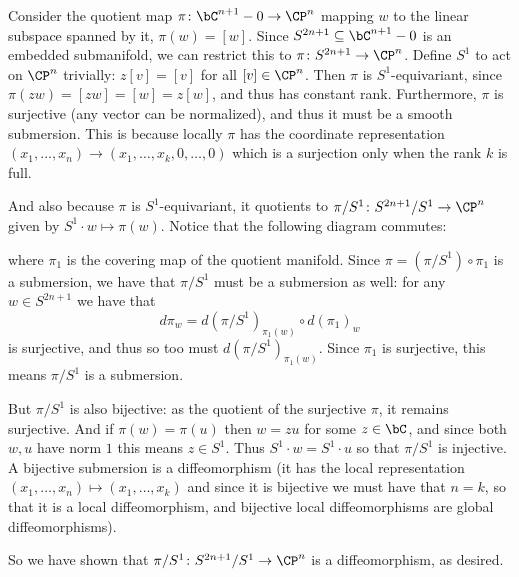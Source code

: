     Consider the quotient map $\pi\colon\bC^{n+1}-0\to\CP^n$ mapping $w$ to the linear subspace spanned by it, $\pi(w)=[w]$.
    Since $S^{2n+1}\subseteq\bC^{n+1}-0$ is an embedded submanifold, we can restrict this to $\pi\colon S^{2n+1}\to\CP^n$.
    Define $S^1$ to act on $\CP^n$ trivially: $z[v]=[v]$ for all $[v]\in\CP^n$.
    Then $\pi$ is $S^1$-equivariant, since $\pi(zw)=[zw]=[w]=z[w]$, and thus has constant rank.
    Furthermore, $\pi$ is surjective (any vector can be normalized), and thus it must be a smooth submersion.
    This is because locally $\pi$ has the coordinate representation $(x_1,\dots,x_n)\to(x_1,\dots,x_k,0,\dots,0)$ which is a surjection only when the rank $k$ is full.

    And also because $\pi$ is $S^1$-equivariant, it quotients to $\pi/S^1\colon S^{2n+1}/S^1\to\CP^n$ given by $S^1\cdot w\mapsto\pi(w)$.
    Notice that the following diagram commutes:

    \centerline{}

    where $\pi_1$ is the covering map of the quotient manifold.
    Since $\pi=(\pi/S^1)\circ\pi_1$ is a submersion, we have that $\pi/S^1$ must be a submersion as well: for any $w\in S^{2n+1}$ we have that
    $$ d\pi_w = d(\pi/S^1)_{\pi_1(w)}\circ d(\pi_1)_w $$
    is surjective, and thus so too must $d(\pi/S^1)_{\pi_1(w)}$.
    Since $\pi_1$ is surjective, this means $\pi/S^1$ is a submersion.

    But $\pi/S^1$ is also bijective: as the quotient of the surjective $\pi$, it remains surjective.
    And if $\pi(w)=\pi(u)$ then $w=zu$ for some $z\in\bC$, and since both $w,u$ have norm $1$ this means $z\in S^1$.
    Thus $S^1\cdot w=S^1\cdot u$ so that $\pi/S^1$ is injective.
    A bijective submersion is a diffeomorphism (it has the local representation $(x_1,\dots,x_n)\mapsto(x_1,\dots,x_k)$ and since it is bijective we must have that $n=k$, so that
    it is a local diffeomorphism, and bijective local diffeomorphisms are global diffeomorphisms).

    So we have shown that $\pi/S^1\colon S^{2n+1}/S^1\to\CP^n$ is a diffeomorphism, as desired.
\eenum




